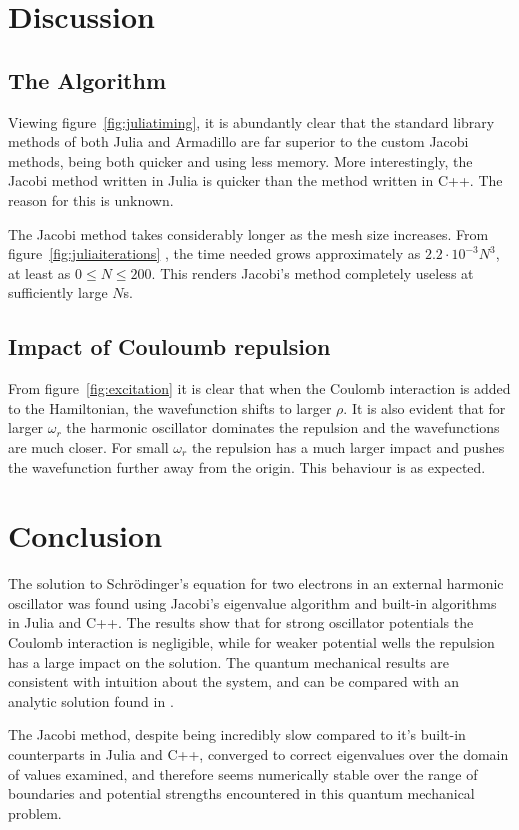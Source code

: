 \documentclass[aps,reprint]{revtex4-1}
\newcommand\blankpage{%
  \null
  \thispagestyle{empty}%
  \addtocounter{page}{-1}%
  \newpage}
\begin{document}
\section{Discussion}

\subsection{The Algorithm}
Viewing figure~\ref{fig:juliatiming}, it is abundantly clear that the standard
library methods of both Julia and Armadillo are far superior to the custom
Jacobi methods, being both quicker and using less memory. More interestingly,
the Jacobi method written in Julia is quicker than the method written in C++.
The reason for this is unknown.

The Jacobi method takes considerably longer as the mesh size increases. From
figure~\ref{fig:juliaiterations} , the time needed grows approximately as
\(2.2\cdot 10^{-3}N^{3}\), at least as \(0\leq N \leq 200\). This renders
Jacobi's method completely useless at sufficiently large \(N\)s.

\subsection{Impact of Couloumb repulsion}
From figure~\ref{fig:excitation} it is clear that when the Coulomb interaction is added to the
Hamiltonian, the wavefunction shifts to larger $\rho$.
It is also evident that for larger $\omega_r$ the harmonic oscillator dominates the repulsion
and the wavefunctions are much closer. For small $\omega_r$ the repulsion
has a much larger impact and pushes the wavefunction further away from the origin.
This behaviour is as expected.
\label{sec:discussion}
\section{Conclusion}
The solution to Schrödinger's equation for two electrons in an external
harmonic oscillator was found using Jacobi's eigenvalue algorithm and built-in
algorithms in Julia and C++. The results show that for strong oscillator potentials
the Coulomb interaction is negligible, while for weaker potential wells the repulsion
has a large impact on the solution. The quantum mechanical results are consistent with
intuition about the system, and can be compared with an analytic solution found
in \cite{taut}.

The Jacobi method, despite being incredibly slow compared to it's built-in
counterparts in Julia and C++, converged to correct eigenvalues over the domain
of values examined, and therefore seems numerically stable over the range of
boundaries and potential strengths encountered in this quantum mechanical problem.
\label{sec:conclusion}

\blankpage
\appendix
\end{document}
